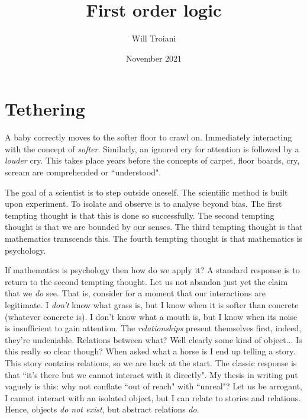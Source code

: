 \documentclass[12pt]{article}
\title{First order logic}
\author{Will Troiani}
\date{November 2021}
\theoremstyle{plain}
\theoremstyle{definition}
\begin{document}
	
	\maketitle
	\tableofcontents
	\section{Tethering}
	A baby correctly moves to the softer floor to crawl on. Immediately interacting with the concept of \emph{softer}. Similarly, an ignored cry for attention is followed by a \emph{louder} cry. This takes place years before the concepts of carpet, floor boards, cry, scream are comprehended or ``understood".
	
	The goal of a scientist is to step outside oneself. The scientific method is built upon experiment. To isolate and observe is to analyse beyond bias. The first tempting thought is that this is done so successfully. The second tempting thought is that we are bounded by our senses. The third tempting thought is that mathematics transcends this. The fourth tempting thought is that mathematics is psychology.
	
	If mathematics is psychology then how do we apply it? A standard response is to return to the second tempting thought. Let us not abandon just yet the claim that we \emph{do} see. That is, consider for a moment that our interactions are legitimate. I \emph{don't} know what grass is, but I know when it is softer than concrete (whatever concrete is). I don't know what a mouth is, but I know when its noise is insufficient to gain attention. The \emph{relationships} present themselves first, indeed, they're undeniable. Relations between what? Well clearly some kind of object... Is this really so clear though? When asked what a horse is I end up telling a story. This story contains relations, so we are back at the start. The classic response is that ``it's there but we cannot interact with it directly". My thesis in writing put vaguely is this: why not conflate ``out of reach" with ``unreal"? Let us be arrogant, I cannot interact with an isolated object, but I can relate to stories and relations. Hence, objects \emph{do not exist}, but abstract relations \emph{do}.
	
\end{document}
